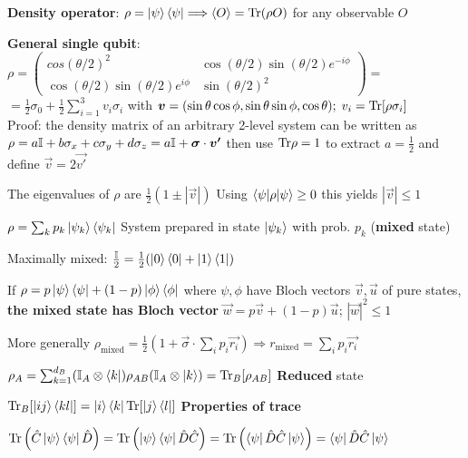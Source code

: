\begin{squishlist}
    \item \textbf{Density operator}: $\rho = \ket{\psi} \bra{\psi} \Longrightarrow \braket{O} = \mathrm{Tr} (\rho O)$ for any observable $O$
    \item \textbf{General single qubit}: $\rho = \begin{pmatrix} cos(\theta/2)^2 & \cos(\theta/2)\sin(\theta/2)e^{-i\phi} \\ \cos(\theta/2)\sin(\theta/2)e^{i\phi} & \sin(\theta/2)^2 \end{pmatrix} = $ \\
    $= \frac{1}{2}\sigma_0 + \frac{1}{2}\sum_{i=1}^3 v_i \sigma_i$ with $\mbox{\boldmath$v$} = (\sin\theta \cos\phi , \sin\theta\sin\phi, \cos\theta);\; v_i = \mathrm{Tr}[\rho \sigma_i]$\\
    
    Proof: the density matrix of an arbitrary 2-level system can be written as \\
    $\rho  = a \mathbb{I}  + b \sigma_x + c \sigma_y + d \sigma_z = a \mathbb{I} + \mbox{\boldmath$\sigma$}\cdot \mbox{\boldmath$v'$}$ then use $\mathrm{Tr} \rho = 1$ to extract $a = \frac{1}{2}$ and define $\vec{v} = 2 \vec{v'}$

    \item The eigenvalues of $\rho$ are $\frac{1}{2}(1 \pm |\vec{v}|)$ Using $\braket{\psi|\rho | \psi} \geq 0$ this yields $|\vec{v}| \leq 1$

    \item $\rho = \sum_k p_k \ket{\psi_k}\bra{\psi_k}$ System prepared in state $\ket{\psi_k}$ with prob. $p_k$ (\textbf{mixed} state)
    \item Maximally mixed: $\frac{\mathbb{I}}{2} = \frac{1}{2} (\ket{0}\bra{0} + \ket{1}\bra{1})$
    \item If $\rho = p \ket{\psi}\bra{\psi} + (1-p) \ket{\phi}\bra{\phi}$ where
    $\psi, \phi$ have Bloch vectors $\vec{v}, \vec{u}$ of pure states, \textbf{the mixed state has Bloch vector} $\vec{w} = p \vec{v} + (1-p) \vec{u}$; $|\vec{w}|^2 \leq 1$

    \item More generally $\rho_{\text{mixed}} = \frac{1}{2} ( 1 + \vec{\sigma} \cdot \sum_i p_i \vec{r_i}) \Longrightarrow r_{\text{mixed}} = \sum_i p_i \vec{r_i}$

    \item $\rho_A = \sum_{k=1}^{d_B}(\mathbb{I}_A \otimes \bra{k})\rho_{AB}(\mathbb{I}_A \otimes \ket{k}) = \mathrm{Tr}_B[\rho_{AB}]$ \quad \textbf{Reduced} state
    
    \item $\mathrm{Tr}_B[\ket{ij}\bra{kl}] = \ket{i}\bra{k} \mathrm{Tr}[\ket{j}\bra{l}]$ \hfill \textbf{Properties of trace}
    \item $\mathrm{Tr}\left(\hat{C}\ket{\psi} \bra{\psi}\hat{D}\right) = \mathrm{Tr}\left(\ket{\psi} \bra{\psi}\hat{D}\hat{C}\right) = \mathrm{Tr}\left( \bra{\psi}\hat{D}\hat{C} \ket{\psi}\right) =  \bra{\psi}\hat{D}\hat{C} \ket{\psi}$


\end{squishlist}
